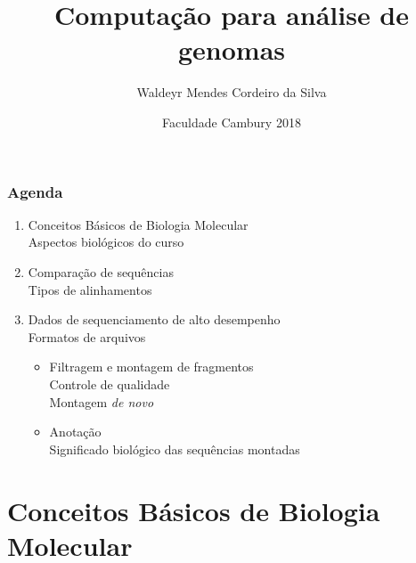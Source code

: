 \documentclass{beamer}
\title{Computação para análise de genomas}
\subtitle{Waldeyr Mendes Cordeiro da Silva}
\author{Faculdade Cambury 2018}
\date{}
\begin{document}
	\setcounter{showProgressBar}{0}
	\setcounter{showSlideNumbers}{0}

	\frame{\titlepage}

	\begin{frame}
		\frametitle{Agenda}
		\begin{enumerate}
			\item Conceitos Básicos de Biologia Molecular\\ \textcolor{ExecusharesGrey}{\footnotesize\hspace{1em} Aspectos biológicos do curso}
			\item Comparação de sequências\\ \textcolor{ExecusharesGrey}{\footnotesize\hspace{1em} Tipos de alinhamentos}
			\item Dados de sequenciamento de alto desempenho\\ \textcolor{ExecusharesGrey}{\footnotesize\hspace{1em} Formatos de arquivos}
			\begin{itemize}
				\item Filtragem e montagem de fragmentos\\ 
				\textcolor{ExecusharesGrey}{\footnotesize\hspace{1em} Controle de qualidade}\\
				\textcolor{ExecusharesGrey}{\footnotesize\hspace{1em} Montagem \textit{de novo}}
				\item Anotação\\ \textcolor{ExecusharesGrey}{\footnotesize\hspace{1em} Significado biológico das sequências montadas}
			\end{itemize}
		\end{enumerate}
	\end{frame}

	\setcounter{framenumber}{0}
	\setcounter{showProgressBar}{1}
	\setcounter{showSlideNumbers}{1}
	
	\section{Conceitos Básicos de Biologia Molecular}
	
\end{document}
